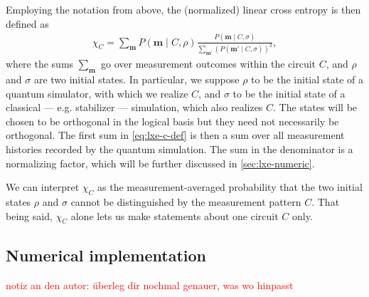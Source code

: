 Employing the notation from above, the (normalized) linear cross entropy is
then defined as \cite{liCrossEntropyBenchmark2023}
\begin{align}\label{eq:lxe-c-def}
  \chi_C = \sum_{\mathbf{m}} P(\mathbf{m} \mid C, \rho) \frac{P(\mathbf{m} \mid
    C, \sigma)}{\sum_{\mathbf{m}'}\left(P(\mathbf{m}' \mid
    C, \sigma)\right)^2}
,\end{align}
where the sums $\sum_\mathbf{m}$ go over measurement outcomes
within the circuit $C$, and $\rho$ and $\sigma$ are two initial
states. In particular, we suppose $\rho$ to be the initial state of a quantum
simulator, with which we realize $C$, and $\sigma$ to be the initial state of a
classical --- e.g. stabilizer --- simulation, which also realizes $C$. The
states will be chosen to be orthogonal in the logical basis 
but they need not necessarily be orthogonal. 
The first sum in \cref{eq:lxe-c-def} is then a sum over all measurement
histories recorded by the quantum simulation. The sum in the denominator is a
normalizing factor, which will be further discussed in \cref{sec:lxe-numeric}.

We can interpret $\chi_C$ as the measurement-averaged probability that the two
initial states $\rho$ and $\sigma$ cannot be distinguished by the measurement
pattern $C$. That being said, $\chi_C$ alone lets us make statements about one circuit
$C$ only.




\subsection{Numerical implementation}
\textcolor{red}{notiz an den autor: \"uberleg dir nochmal genauer, was wo hinpasst}

